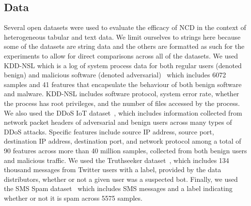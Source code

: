 \documentclass[preprint,12pt]{article}
\begin{document}
\subsection{Data}
\label{datasets}

Several open datasets were used to evaluate the efficacy of NCD in the context of heterogeneous tabular and text data.
We limit ourselves to strings here because some of the datasets are string data and the others are formatted as such for the experiments to allow for direct comparisons across all of the datasets.
We used KDD-NSL which is a log of system process data for both regular users (denoted benign) and malicious software (denoted adversarial)~\cite{kddnsl} which includes 6072 samples and 41 features that encapsulate the behaviour of both benign software and malware.
KDD-NSL includes software protocol, system error rate, whether the process has root privileges, and the number of files accessed by the process.
We also used the DDoS IoT dataset~\cite{ddos}, which includes information collected from network packet headers of adversarial and benign users across many types of DDoS attacks.
Specific features include source IP address, source port, destination IP address, destination port, and network protocol among a total of 90 features across more than 40 million samples, collected from both benign users and malicious traffic.
We used the Truthseeker dataset~\cite{truthseeker}, which includes 134 thousand messages from Twitter users with a label, provided by the data distributors, whether or not a given user was a suspected bot.
Finally, we used the SMS Spam dataset~\cite{sms_spam} which includes SMS messages and a label indicating whether or not it is spam across 5575 samples.
\end{document}
